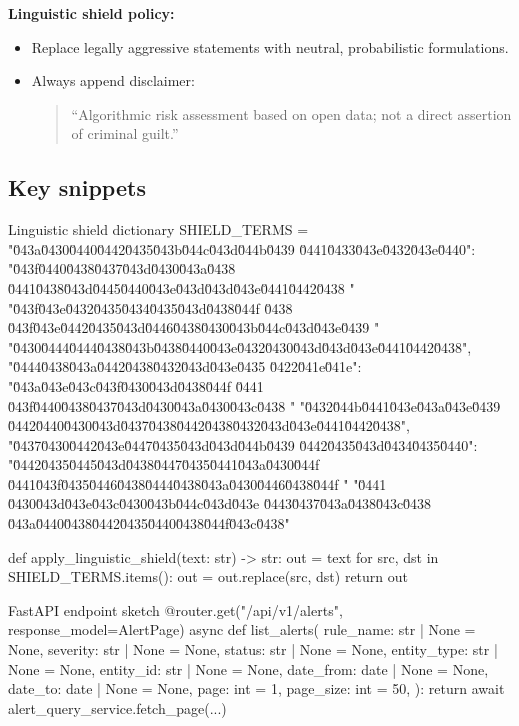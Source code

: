 \documentclass[11pt,a4paper]{article}
\begin{document}
\textbf{Linguistic shield policy:}
\begin{itemize}[leftmargin=1.4em]
  \item Replace legally aggressive statements with neutral, probabilistic formulations.
  \item Always append disclaimer:
  \begin{quote}
  ``Algorithmic risk assessment based on open data; not a direct assertion of criminal guilt.''
  \end{quote}
\end{itemize}

\subsection{Key snippets}
\begin{codeblock}[language=Python]{Linguistic shield dictionary}
SHIELD_TERMS = {
    "\u043a\u0430\u0440\u0442\u0435\u043b\u044c\u043d\u044b\u0439 \u0441\u0433\u043e\u0432\u043e\u0440":
      "\u043f\u0440\u0438\u0437\u043d\u0430\u043a\u0438 \u0441\u0438\u043d\u0445\u0440\u043e\u043d\u043d\u043e\u0441\u0442\u0438 "
      "\u043f\u043e\u0432\u0435\u0434\u0435\u043d\u0438\u044f \u0438 \u043f\u043e\u0442\u0435\u043d\u0446\u0438\u0430\u043b\u044c\u043d\u043e\u0439 "
      "\u0430\u0444\u0444\u0438\u043b\u0438\u0440\u043e\u0432\u0430\u043d\u043d\u043e\u0441\u0442\u0438",
    "\u0444\u0438\u043a\u0442\u0438\u0432\u043d\u043e\u0435 \u0422\u041e\u041e":
      "\u043a\u043e\u043c\u043f\u0430\u043d\u0438\u044f \u0441 \u043f\u0440\u0438\u0437\u043d\u0430\u043a\u0430\u043c\u0438 "
      "\u0432\u044b\u0441\u043e\u043a\u043e\u0439 \u0442\u0440\u0430\u043d\u0437\u0438\u0442\u0438\u0432\u043d\u043e\u0441\u0442\u0438",
    "\u0437\u0430\u0442\u043e\u0447\u0435\u043d\u043d\u044b\u0439 \u0442\u0435\u043d\u0434\u0435\u0440":
      "\u0442\u0435\u0445\u043d\u0438\u0447\u0435\u0441\u043a\u0430\u044f \u0441\u043f\u0435\u0446\u0438\u0444\u0438\u043a\u0430\u0446\u0438\u044f "
      "\u0441 \u0430\u043d\u043e\u043c\u0430\u043b\u044c\u043d\u043e \u0443\u0437\u043a\u0438\u043c\u0438 \u043a\u0440\u0438\u0442\u0435\u0440\u0438\u044f\u043c\u0438"
}

def apply_linguistic_shield(text: str) -> str:
    out = text
    for src, dst in SHIELD_TERMS.items():
        out = out.replace(src, dst)
    return out
\end{codeblock}

\begin{codeblock}[language=Python]{FastAPI endpoint sketch}
@router.get("/api/v1/alerts", response_model=AlertPage)
async def list_alerts(
    rule_name: str | None = None,
    severity: str | None = None,
    status: str | None = None,
    entity_type: str | None = None,
    entity_id: str | None = None,
    date_from: date | None = None,
    date_to: date | None = None,
    page: int = 1,
    page_size: int = 50,
):
    return await alert_query_service.fetch_page(...)
\end{codeblock}
\end{document}
